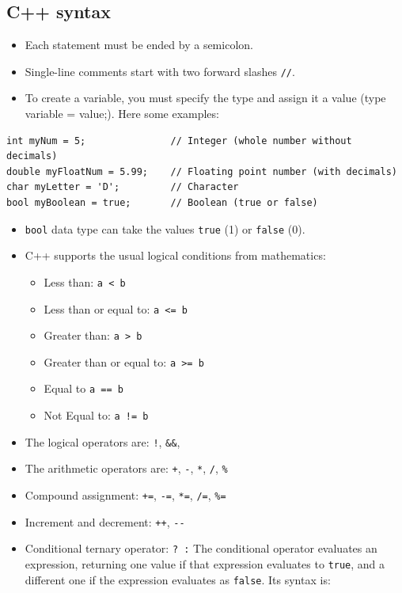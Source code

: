 \hypertarget{c-syntax}{%
\subsection{C++ syntax}\label{c-syntax}}

\begin{itemize}
\tightlist
\item
  Each statement must be ended by a semicolon.
\item
  Single-line comments start with two forward slashes \texttt{//}.
\item
  To create a variable, you must specify the type and assign it a value (type variable = value;). Here some examples:
\end{itemize}

\begin{verbatim}
int myNum = 5;               // Integer (whole number without decimals)
double myFloatNum = 5.99;    // Floating point number (with decimals)
char myLetter = 'D';         // Character
bool myBoolean = true;       // Boolean (true or false)
\end{verbatim}

\begin{itemize}
\tightlist
\item
  \texttt{bool} data type can take the values \texttt{true} (1) or \texttt{false} (0).
\item
  C++ supports the usual logical conditions from mathematics:

  \begin{itemize}
  \tightlist
  \item
    Less than: \texttt{a\ \textless{}\ b}
  \item
    Less than or equal to: \texttt{a\ \textless{}=\ b}
  \item
    Greater than: \texttt{a\ \textgreater{}\ b}
  \item
    Greater than or equal to: \texttt{a\ \textgreater{}=\ b}
  \item
    Equal to \texttt{a\ ==\ b}
  \item
    Not Equal to: \texttt{a\ !=\ b}
  \end{itemize}
\item
  The logical operators are: \texttt{!}, \texttt{\&\&}, \texttt{\textbar{}\textbar{}}
\item
  The arithmetic operators are: \texttt{+}, \texttt{-}, \texttt{*}, \texttt{/}, \texttt{\%}
\item
  Compound assignment: \texttt{+=}, \texttt{-=}, \texttt{*=}, \texttt{/=}, \texttt{\%=}
\item
  Increment and decrement: \texttt{++}, \texttt{-\/-}
\item
  Conditional ternary operator: \texttt{?\ :}
  The conditional operator evaluates an expression, returning one value if that expression evaluates to \texttt{true}, and a different one if the expression evaluates as \texttt{false}. Its syntax is:
\end{itemize}


